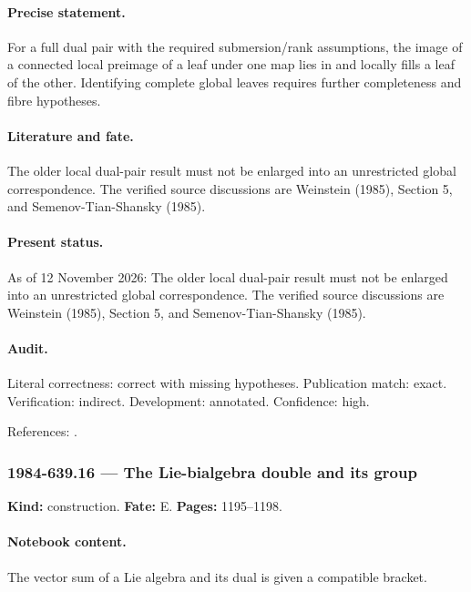 \paragraph{Precise statement.} For a full dual pair with the required submersion/rank assumptions, the image of a connected local preimage of a leaf under one map lies in and locally fills a leaf of the other. Identifying complete global leaves requires further completeness and fibre hypotheses.

\paragraph{Literature and fate.} The older local dual-pair result must not be enlarged into an unrestricted global correspondence. The verified source discussions are Weinstein (1985), Section 5, and Semenov-Tian-Shansky (1985).

\paragraph{Present status.} As of 12 November 2026: The older local dual-pair result must not be enlarged into an unrestricted global correspondence. The verified source discussions are Weinstein (1985), Section 5, and Semenov-Tian-Shansky (1985).

\paragraph{Audit.} Literal correctness: correct with missing hypotheses. Publication match: exact. Verification: indirect. Development: annotated. Confidence: high.

\noindent References: \citep{weinstein1983local,weinstein1985poisson,semenov1985dressing}.\par

\subsubsection{1984-639.16 --- The Lie-bialgebra double and its group}

\label{item:1984-639.16}

\noindent\textbf{Kind:} construction. \textbf{Fate:} E. \textbf{Pages:} 1195--1198.\par

\paragraph{Notebook content.} The vector sum of a Lie algebra and its dual is given a compatible bracket.

